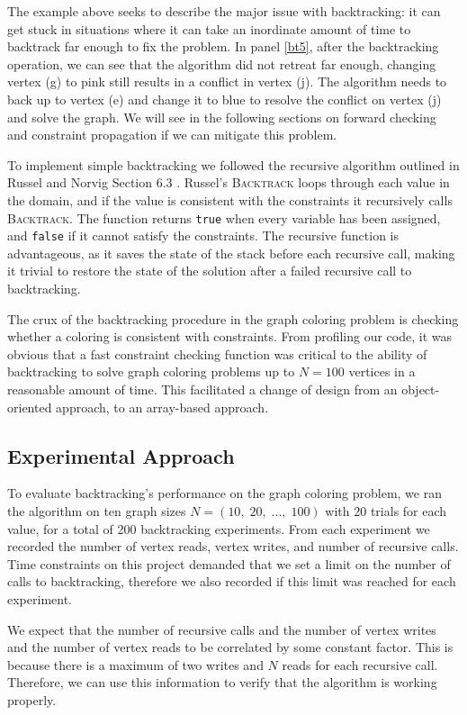 \documentclass{article}
\begin{document}
		The example above seeks to describe the major issue with backtracking: it can get stuck in situations where it can take an inordinate amount of time to backtrack far enough to fix the problem. In panel \ref{bt5}, after the backtracking operation, we can see that the algorithm did not retreat far enough, changing vertex (g) to pink still results in a conflict in vertex (j). The algorithm needs to back up to vertex (e) and change it to blue to resolve the conflict on vertex (j) and solve the graph. We will see in the following sections on forward checking and constraint propagation if we can mitigate this problem.
		
		To implement simple backtracking we followed the recursive algorithm outlined in Russel and Norvig Section 6.3 \cite{ai}. Russel's \textsc{Backtrack} loops through each value in the domain, and if the value is consistent with the constraints it recursively calls \textsc{Backtrack}. The function returns \texttt{true} when every variable has been assigned, and \texttt{false} if it cannot satisfy the constraints. The recursive function is advantageous, as it saves the state of the stack before each recursive call, making it trivial to restore the state of the solution after a failed recursive call to backtracking. 
		
		The crux of the backtracking procedure in the graph coloring problem is checking whether a coloring is consistent with constraints. From profiling our code, it was obvious that a fast constraint checking function was critical to the ability of backtracking to solve graph coloring problems up to $N=100$ vertices in a reasonable amount of time. This facilitated a change of design from an object-oriented approach, to an array-based approach.
	\subsection{Experimental Approach}
		\label{simple_exp_appr}
		To evaluate backtracking's performance on the graph coloring problem, we ran the algorithm on ten graph sizes $N=(10,\;20,\;...,\;100)$ with 20 trials for each value, for a total of 200 backtracking experiments. From each experiment we recorded the number of vertex reads, vertex writes, and number of recursive calls. Time constraints on this project demanded that we set a limit on the number of calls to backtracking, therefore we also recorded if this limit was reached for each experiment. 
		
		We expect that the number of recursive calls and the number of vertex writes and the number of vertex reads to be correlated by some constant factor. This is because there is a maximum of two writes and $N$ reads for each recursive call. Therefore, we can use this information to verify that the algorithm is working properly.
		
\end{document}
